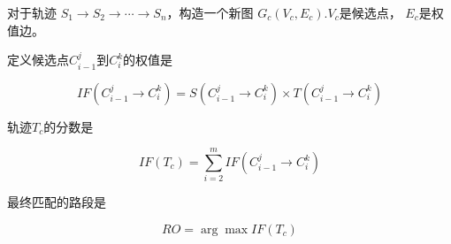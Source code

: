 对于轨迹 $ S_{1} \longrightarrow S_{2} \longrightarrow \cdots \longrightarrow S_{n} $，构造一个新图 $ G_{c}\left(V_{c}, E_{c}\right) $.$V_c$是候选点， $E_c$是权值边。

定义候选点$C_{i-1}^{j}$到$C_{i}^{k}$的权值是

$$ I F\left(C_{i-1}^{j} \rightarrow C_{i}^{k}\right)=S\left(C_{i-1}^{j} \rightarrow C_{i}^{k}\right) \times T\left(C_{i-1}^{j} \rightarrow C_{i}^{k}\right) $$

轨迹$T_c$的分数是

$$ I F\left(T_{c}\right)=\sum_{i=2}^{m} I F\left(C_{i-1}^{j} \rightarrow C_{i}^{k}\right) $$

最终匹配的路段是

$$RO = \arg \max IF(T_c)$$